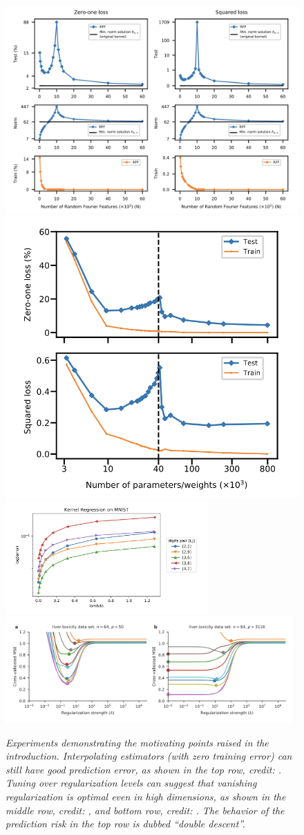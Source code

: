\documentclass{article}
\begin{document}
\begin{figure}[p]
\centering
\hspace{-20pt}
\includegraphics[height=0.39\textwidth]{belkin1.png}
\includegraphics[height=0.39\textwidth]{belkin2.png} 
\bigskip\medskip \\
\includegraphics[width=0.69\textwidth]{liang.png} 
\bigskip \\
\includegraphics[width=0.98\textwidth]{kobak.png}
\caption{\it Experiments demonstrating the motivating points raised in the
  introduction. Interpolating estimators (with zero training error) can still   
  have good prediction error, as shown in the top row, credit:
  \citet{belkin2019reconciling}. Tuning over regularization levels can 
  suggest that vanishing regularization is optimal even in high 
  dimensions, as shown in the middle row, credit: \citet{liang2020just}, and
  bottom row, credit: \citet{kobak2020optimal}. The behavior of the prediction
  risk in the top row is dubbed ``double descent''.}   
\label{fig:experiments}
\end{figure}
\end{document}
